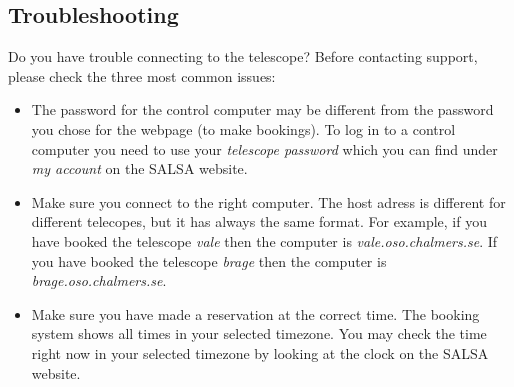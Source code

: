 \subsection{Troubleshooting}
Do you have trouble connecting to the telescope? Before contacting support,
please check the three most common issues:
\begin{itemize} 
\item The password for the control computer may be different from the password
you chose for the webpage (to make bookings). To log in to a control computer
you need to use your \emph{telescope password} which you can find under
\emph{my account} on the SALSA website.
\item Make sure you connect to the right computer. The host adress is different
for different telecopes, but it has always the same format. For example, if
you have booked the telescope \emph{vale} then the computer is
\emph{vale.oso.chalmers.se}. If you have booked the telescope \emph{brage}
then the computer is \emph{brage.oso.chalmers.se}. 
\item Make sure you have made a reservation at the correct time. The booking
	system shows all times in your selected timezone. You may check the time
	right now in your selected timezone by looking at the clock on the SALSA
	website. 
\end{itemize}

